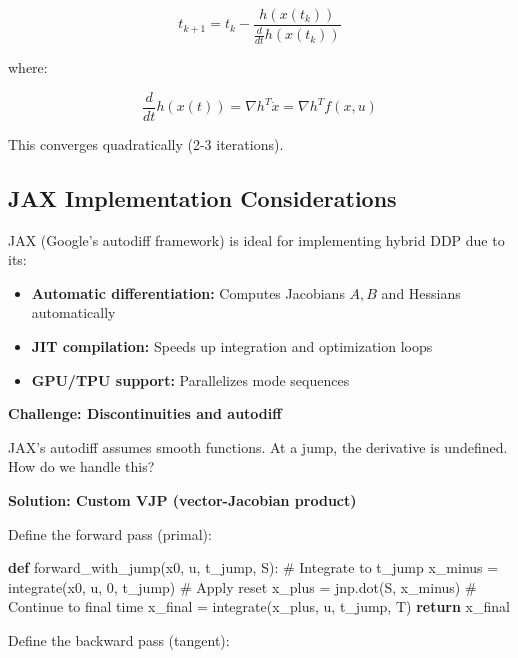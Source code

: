 \documentclass[
  letterpaper,
  DIV=11,
  numbers=noendperiod]{scrartcl}
\newenvironment{Shaded}{\begin{snugshade}}{\end{snugshade}}
\newcommand{\CommentTok}[1]{\textcolor[rgb]{0.37,0.37,0.37}{#1}}
\newcommand{\ControlFlowTok}[1]{\textcolor[rgb]{0.00,0.23,0.31}{\textbf{#1}}}
\newcommand{\DecValTok}[1]{\textcolor[rgb]{0.68,0.00,0.00}{#1}}
\newcommand{\KeywordTok}[1]{\textcolor[rgb]{0.00,0.23,0.31}{\textbf{#1}}}
\newcommand{\NormalTok}[1]{\textcolor[rgb]{0.00,0.23,0.31}{#1}}
\newcommand{\OperatorTok}[1]{\textcolor[rgb]{0.37,0.37,0.37}{#1}}
\providecommand{\tightlist}{%
  \setlength{\itemsep}{0pt}\setlength{\parskip}{0pt}}\usepackage{longtable,booktabs,array}
\begin{document}
\[
t_{k+1} = t_k - \frac{h(x(t_k))}{\frac{d}{dt}h(x(t_k))}
\]

where:

\[
\frac{d}{dt}h(x(t)) = \nabla h^T \dot{x} = \nabla h^T f(x, u)
\]

This converges quadratically (2-3 iterations).

\subsection{JAX Implementation
Considerations}\label{jax-implementation-considerations}

JAX (Google's autodiff framework) is ideal for implementing hybrid DDP
due to its:

\begin{itemize}
\tightlist
\item
  \textbf{Automatic differentiation:} Computes Jacobians \(A, B\) and
  Hessians automatically
\item
  \textbf{JIT compilation:} Speeds up integration and optimization loops
\item
  \textbf{GPU/TPU support:} Parallelizes mode sequences
\end{itemize}

\textbf{Challenge: Discontinuities and autodiff}

JAX's autodiff assumes smooth functions. At a jump, the derivative is
undefined. How do we handle this?

\textbf{Solution: Custom VJP (vector-Jacobian product)}

Define the forward pass (primal):

\begin{Shaded}
\begin{Highlighting}[]
\KeywordTok{def}\NormalTok{ forward\_with\_jump(x0, u, t\_jump, S):}
    \CommentTok{\# Integrate to t\_jump}
\NormalTok{    x\_minus }\OperatorTok{=}\NormalTok{ integrate(x0, u, }\DecValTok{0}\NormalTok{, t\_jump)}
    \CommentTok{\# Apply reset}
\NormalTok{    x\_plus }\OperatorTok{=}\NormalTok{ jnp.dot(S, x\_minus)}
    \CommentTok{\# Continue to final time}
\NormalTok{    x\_final }\OperatorTok{=}\NormalTok{ integrate(x\_plus, u, t\_jump, T)}
    \ControlFlowTok{return}\NormalTok{ x\_final}
\end{Highlighting}
\end{Shaded}

Define the backward pass (tangent):
\end{document}
